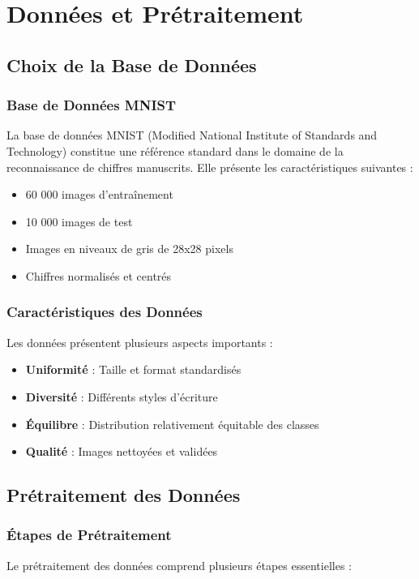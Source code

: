 \chapter{Données et Prétraitement}

\section{Choix de la Base de Données}

\subsection{Base de Données MNIST}
La base de données MNIST (Modified National Institute of Standards and Technology) constitue une référence standard dans le domaine de la reconnaissance de chiffres manuscrits. Elle présente les caractéristiques suivantes :

\begin{itemize}
    \item 60 000 images d'entraînement
    \item 10 000 images de test
    \item Images en niveaux de gris de 28x28 pixels
    \item Chiffres normalisés et centrés
\end{itemize}

\subsection{Caractéristiques des Données}
Les données présentent plusieurs aspects importants :
\begin{itemize}
    \item \textbf{Uniformité} : Taille et format standardisés
    \item \textbf{Diversité} : Différents styles d'écriture
    \item \textbf{Équilibre} : Distribution relativement équitable des classes
    \item \textbf{Qualité} : Images nettoyées et validées
\end{itemize}

\section{Prétraitement des Données}

\subsection{Étapes de Prétraitement}
Le prétraitement des données comprend plusieurs étapes essentielles :

